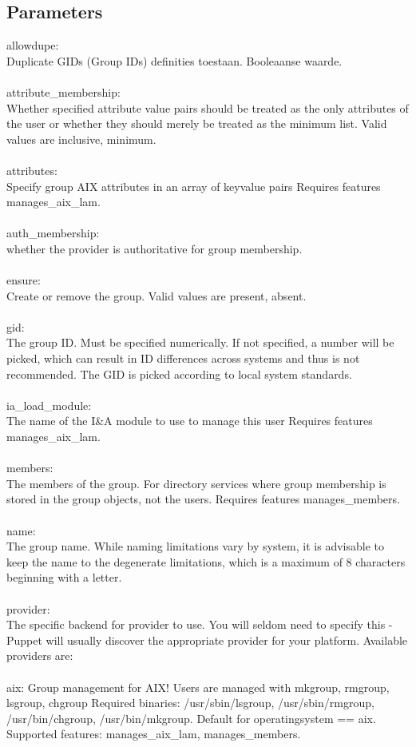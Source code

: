 \subsection{Parameters}
allowdupe:\\
Duplicate GIDs (Group IDs) definities toestaan. Booleaanse waarde.\\\\
%
attribute\_membership:\\
Whether specified attribute value pairs should be treated as the only attributes of the user or whether they should merely be treated as the minimum list. Valid values are inclusive, minimum.\\\\
%
attributes:\\
Specify group AIX attributes in an array of keyvalue pairs Requires features manages\_aix\_lam.\\\\
%
auth\_membership:\\
whether the provider is authoritative for group membership.\\\\
%
ensure:\\
Create or remove the group. Valid values are present, absent.\\\\
%
gid:\\
The group ID. Must be specified numerically. If not specified, a number will be picked, which can result in ID differences across systems and thus is not recommended. The GID is picked according to local system standards.\\\\
%
ia\_load\_module:\\
The name of the I\&A module to use to manage this user Requires features manages\_aix\_lam.\\\\
%
members:\\
The members of the group. For directory services where group membership is stored in the group objects, not the users. Requires features manages\_members.\\\\
%
name:\\
The group name. While naming limitations vary by system, it is advisable to keep the name to the degenerate limitations, which is a maximum of 8 characters beginning with a letter.\\\\
%
provider:\\
The specific backend for provider to use. You will seldom need to specify this - Puppet will usually discover the appropriate provider for your platform. Available providers are:\\\\
%
    aix: Group management for AIX! Users are managed with mkgroup, rmgroup, lsgroup, chgroup Required binaries: /usr/sbin/lsgroup, /usr/sbin/rmgroup, /usr/bin/chgroup, /usr/bin/mkgroup. Default for operatingsystem == aix. Supported features: manages\_aix\_lam, manages\_members.

